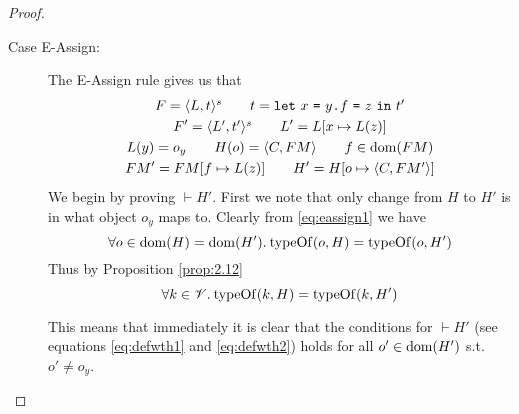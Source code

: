 \begin{proof}
\begin{description}
\begin{description}
\begin{description}
            \item[Case {\sc E-Assign}:] The {\sc E-Assign} rule gives us that
              \begin{equation} \label{eq:eassign1}
                \begin{gathered}
                  F = \mbox{$\langle L, t \rangle^s$} \quad\quad t = \mbox{\mdseries\texttt{let}~$x$~\texttt{=}~$\mbox{\mdseries$y$\texttt{.}$f$~\texttt{=}~$z$}$~\texttt{in}~$t'$} \\
                  F' = \mbox{$\langle L', t' \rangle^s$} \quad\quad L' = L[x \mapsto L(z)] \\
                  L(y) = o_y \quad\quad H(o) = \mbox{$\langle C, FM \rangle$} \quad\quad f \in \mbox{$\mathrm{dom}$}(FM)
                  \\
                  FM' = FM[f \mapsto L(z)] \quad\quad H' = H[o \mapsto \mbox{$\langle C, FM' \rangle$}]
                \end{gathered}
              \end{equation}
              We begin by proving $\vdash H'$. First we note
              that only change from $H$ to $H'$ is in what object $o_y$ maps to.
              Clearly from \eqref{eq:eassign1} we have
              \begin{equation} \label{eq:eassign2}
                \forall o \in \mbox{$\mathrm{dom}$}(H) = \mbox{$\mathrm{dom}$}(H'). \: \mbox{$\mathrm{typeOf}$}(o, H) = \mbox{$\mathrm{typeOf}$}(o,
                H')
              \end{equation}
              Thus by Proposition \ref{prop:2.12} 
              \begin{equation} \label{eq:eassign3}
                \forall k \in \mathscr{V}. \: \mbox{$\mathrm{typeOf}$}(k, H) = \mbox{$\mathrm{typeOf}$}(k,
                H')
              \end{equation}
              \begin{addmargin}[1em]{1em}
                \begin{remark}
                  This means that immediately it is clear that the conditions
                  for $\vdash H'$ (see equations \eqref{eq:defwth1} and
                  \eqref{eq:defwth2}) holds for all $o' \in \mbox{$\mathrm{dom}$}(H')$ s.t. $o'
                  \neq o_y$.
                \end{remark}
              \end{addmargin}


\end{description}
\end{description}
\end{description}
\end{proof}
